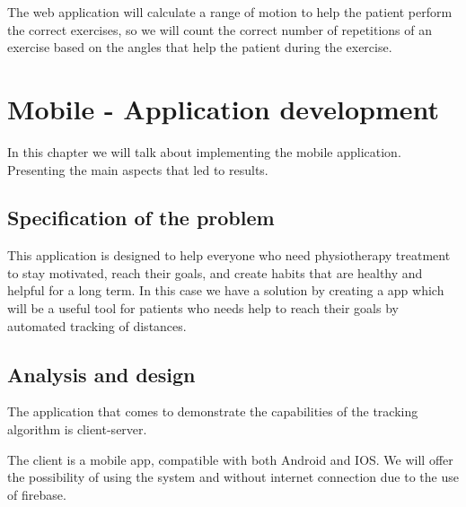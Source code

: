 The web application will calculate a range of motion to help the patient perform the correct exercises, so we will count the correct number of repetitions of an exercise based on the angles that help the patient during the exercise.

\section{Mobile - Application development}

In this chapter we will talk about implementing the mobile application. 
Presenting the main aspects that led to results.

\subsection{Specification of the problem}
 
\par This application is designed to help everyone who need physiotherapy treatment to stay motivated,
 reach their goals, and create habits that are healthy and helpful for a long term. 
 In this case we have a solution by creating a app which will be a useful tool for patients who needs help to reach their goals by automated tracking of distances.
 
\subsection{Analysis and design}
The application that comes to demonstrate the capabilities of the tracking algorithm is client-server.


The client is a mobile app, compatible with both Android and IOS.
We will offer the possibility of using the system and without internet connection due to the use of firebase.

